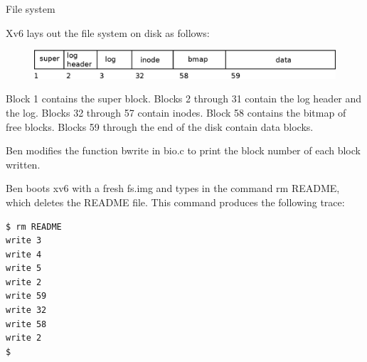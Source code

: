 \documentclass[11pt]{exam}
\def\answers{1}
\begin{document}
\begin{questions}

\addpoints
\question File system


Xv6 lays out the file system on disk as follows:

\begin{figure}[h] \centering
  \includegraphics[width=0.8\columnwidth]{figs/fs}
  \label{fig:ramengine-decomposed-app}

\end{figure}

Block 1 contains the super block. Blocks 2 through 31 contain the log header
and the log. Blocks 32 through 57 contain inodes. Block 58 contains the bitmap
of free blocks. Blocks 59 through the end of the disk contain data blocks.

Ben modifies the function bwrite in bio.c to print the block number of each
block written.

Ben boots xv6 with a fresh fs.img and types in the
command rm README, which deletes the README file.
This command produces the following trace:

\begin{verbatim} 
$ rm README
write 3
write 4
write 5
write 2
write 59
write 32
write 58
write 2
$
\end{verbatim}

\end{questions}
\end{document}
